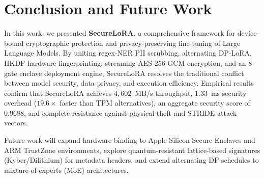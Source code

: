 \documentclass[10pt,conference,compsocconf]{IEEEtran}
\begin{document}
\section{Conclusion and Future Work}
\label{sec:conclusion}

In this work, we presented \textbf{SecureLoRA}, a comprehensive framework for device-bound cryptographic protection and privacy-preserving fine-tuning of Large Language Models. By uniting regex-NER PII scrubbing, alternating DP-LoRA, HKDF hardware fingerprinting, streaming AES-256-GCM encryption, and an 8-gate enclave deployment engine, SecureLoRA resolves the traditional conflict between model security, data privacy, and execution efficiency. Empirical results confirm that SecureLoRA achieves $4,602$~MB/s throughput, $1.33$~ms security overhead ($19.6\times$ faster than TPM alternatives), an aggregate security score of $0.9688$, and complete resistance against physical theft and STRIDE attack vectors.

Future work will expand hardware binding to Apple Silicon Secure Enclaves and ARM TrustZone environments, explore quantum-resistant lattice-based signatures (Kyber/Dilithium) for metadata headers, and extend alternating DP schedules to mixture-of-experts (MoE) architectures.
\end{document}
